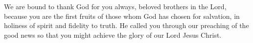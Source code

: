 \lettrine[lines=3]{W}{}e are bound to thank God for you always, beloved brothers in the Lord, because you are the first fruits of those whom God has chosen for salvation, in holiness of spirit and fidelity to truth. He called you through our preaching of the good news so that you might achieve the glory of our Lord Jesus Christ.
